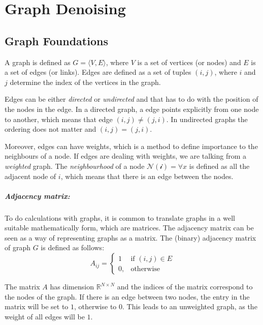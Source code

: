 \chapter{Graph Denoising}




\section{Graph Foundations}
A graph is defined as  $G = \langle V,E \rangle$, where $V$ is a set of 
vertices (or nodes) and $E$ is a set of edges (or links). 
Edges are defined as a set of tuples $(i, j)$, where $i$ and $j$ determine the 
index of the vertices in the graph.

Edges can be either \textit{directed} or \textit{undirected} and that has to do with the position of the 
nodes in the edge. In a directed graph, a edge points explicitly from
one node to another, which means that edge $(i, j) \neq (j, i)$. 
In undirected graphs the ordering does not matter and  $(i, j) = (j, i)$.

Moreover, edges can have weights, which is a method to define importance to the neighbours of a node.
If edges are dealing with weights, we are talking from a \textit{weighted} graph.
The \textit{neighbourhood} of a node $\mathcal{N(i)} = \forall x $ is defined as all the adjacent node 
of $i$, which means that there is an edge between the nodes. 

\paragraph{Adjacency matrix:}
To do calculations with graphs, it is common to translate graphs in a well suitable mathematically
form, which are matrices.
The adjacency matrix can be seen as a way of representing graphs as a matrix.
The (binary) adjacency matrix of graph $G$ is defined as follows:
\begin{equation}
    \label{eg:AdjacencyMatrix}
    A_{ij} =    
    \begin{cases}
        1  & \text{if } (i, j) \in E \\
        0, & \text{otherwise}
    \end{cases}
\end{equation}

The matrix $A$ has dimension $\mathbb{R}^{N \times N}$ and the indices of the matrix correspond to the nodes of the graph.
If there is an edge between two nodes, the entry in the matrix will be set to $1$, otherwise to $0$.
This leads to an unweighted graph, as the weight of all edges will be $1$. 

